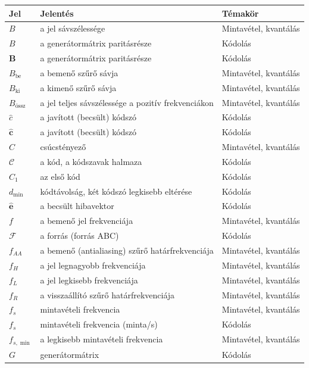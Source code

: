 {\small\renewcommand{\arraystretch}{1.2}\begin{longtable}{@{}>{\raggedright\arraybackslash}p{2.4cm}>{\raggedright\arraybackslash}p{8.2cm}>{\raggedright\arraybackslash}p{3.8cm}@{}}\toprule
\textbf{Jel} & \textbf{Jelentés} & \textbf{Témakör}\\\midrule\endhead
$B$ & a jel sávszélessége & Mintavétel, kvantálás\\
$B$ & a generátormátrix paritásrésze & Kódolás\\
$\mathbf B$ & a generátormátrix paritásrésze & Kódolás\\
$B_\text{be}$ & a bemenő szűrő sávja & Mintavétel, kvantálás\\
$B_\text{ki}$ & a kimenő szűrő sávja & Mintavétel, kvantálás\\
$B_\text{össz}$ & a jel teljes sávszélessége a pozitív frekvenciákon & Mintavétel, kvantálás\\
$\hat c$ & a javított (becsült) kódszó & Kódolás\\
$\hat{\mathbf c}$ & a javított (becsült) kódszó & Kódolás\\
$C$ & csúcstényező & Mintavétel, kvantálás\\
$\mathcal C$ & a kód, a kódszavak halmaza & Kódolás\\
$C_1$ & az első kód & Kódolás\\
$d_{\min}$ & kódtávolság, két kódszó legkisebb eltérése & Kódolás\\
$\hat{\mathbf e}$ & a becsült hibavektor & Kódolás\\
$f$ & a bemenő jel frekvenciája & Mintavétel, kvantálás\\
$\mathcal F$ & a forrás (forrás ABC) & Kódolás\\
$f_{AA}$ & a bemenő (antialiasing) szűrő határfrekvenciája & Mintavétel, kvantálás\\
$f_H$ & a jel legnagyobb frekvenciája & Mintavétel, kvantálás\\
$f_L$ & a jel legkisebb frekvenciája & Mintavétel, kvantálás\\
$f_R$ & a visszaállító szűrő határfrekvenciája & Mintavétel, kvantálás\\
$f_s$ & mintavételi frekvencia & Mintavétel, kvantálás\\
$f_s$ & mintavételi frekvencia (minta/s) & Kódolás\\
$f_{s,\min}$ & a legkisebb mintavételi frekvencia & Mintavétel, kvantálás\\
$G$ & generátormátrix & Kódolás\\

\end{longtable}}
